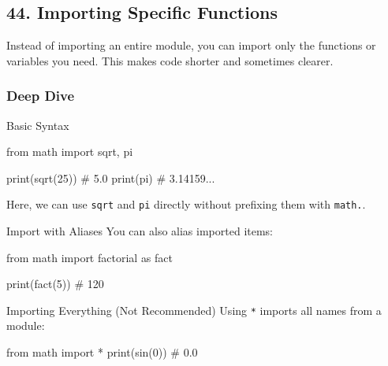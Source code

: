 \documentclass[
  letterpaper,
  DIV=11,
  numbers=noendperiod]{scrreprt}
\newenvironment{Shaded}{\begin{snugshade}}{\end{snugshade}}
\newcommand{\BuiltInTok}[1]{\textcolor[rgb]{0.00,0.23,0.31}{#1}}
\newcommand{\CommentTok}[1]{\textcolor[rgb]{0.37,0.37,0.37}{#1}}
\newcommand{\DecValTok}[1]{\textcolor[rgb]{0.68,0.00,0.00}{#1}}
\newcommand{\ImportTok}[1]{\textcolor[rgb]{0.00,0.46,0.62}{#1}}
\newcommand{\NormalTok}[1]{\textcolor[rgb]{0.00,0.23,0.31}{#1}}
\newcommand{\OperatorTok}[1]{\textcolor[rgb]{0.37,0.37,0.37}{#1}}
\begin{document}
\subsection{44. Importing Specific
Functions}\label{importing-specific-functions}

Instead of importing an entire module, you can import only the functions
or variables you need. This makes code shorter and sometimes clearer.

\subsubsection{Deep Dive}\label{deep-dive-43}

Basic Syntax

\begin{Shaded}
\begin{Highlighting}[]
\ImportTok{from}\NormalTok{ math }\ImportTok{import}\NormalTok{ sqrt, pi}

\BuiltInTok{print}\NormalTok{(sqrt(}\DecValTok{25}\NormalTok{))   }\CommentTok{\# 5.0}
\BuiltInTok{print}\NormalTok{(pi)         }\CommentTok{\# 3.14159...}
\end{Highlighting}
\end{Shaded}

Here, we can use \texttt{sqrt} and \texttt{pi} directly without
prefixing them with \texttt{math.}.

Import with Aliases You can also alias imported items:

\begin{Shaded}
\begin{Highlighting}[]
\ImportTok{from}\NormalTok{ math }\ImportTok{import}\NormalTok{ factorial }\ImportTok{as}\NormalTok{ fact}

\BuiltInTok{print}\NormalTok{(fact(}\DecValTok{5}\NormalTok{))   }\CommentTok{\# 120}
\end{Highlighting}
\end{Shaded}

Importing Everything (Not Recommended) Using \texttt{*} imports all
names from a module:

\begin{Shaded}
\begin{Highlighting}[]
\ImportTok{from}\NormalTok{ math }\ImportTok{import} \OperatorTok{*}
\BuiltInTok{print}\NormalTok{(sin(}\DecValTok{0}\NormalTok{))   }\CommentTok{\# 0.0}
\end{Highlighting}
\end{Shaded}
\end{document}
